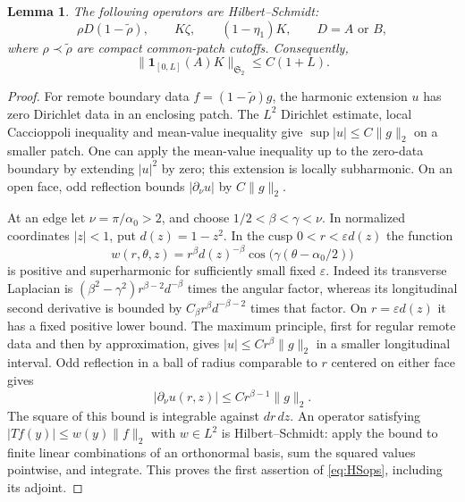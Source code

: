 \documentclass[11pt]{amsart}
\numberwithin{equation}{section}
\newtheorem{lemma}[theorem]{Lemma}
\theoremstyle{remark}
\newcommand{\one}{\mathbf{1}}
\newcommand{\Stwo}{\mathfrak{S}_2}
\begin{document}
\begin{lemma}\label{lem:HS}
The following operators are Hilbert--Schmidt:
\begin{equation}\label{eq:HSops}
\rho D(1-\widetilde\rho),\qquad K\zeta,\qquad (1-\eta_1)K,\qquad D=A\text{ or }B,
\end{equation}
where $\rho\prec\widetilde\rho$ are compact common-patch cutoffs. Consequently,
\begin{equation}\label{eq:HSK}
\|\one_{[0,L]}(A)K\|_{\Stwo}\le C(1+L) .
\end{equation}
\end{lemma}

\begin{proof}
For remote boundary data $f=(1-\widetilde\rho)g$, the harmonic extension $u$ has zero Dirichlet data in an enclosing patch. The $L^2$ Dirichlet estimate, local Caccioppoli inequality and mean-value inequality give $\sup|u|\le C\|g\|_2$ on a smaller patch. One can apply the mean-value inequality up to the zero-data boundary by extending $|u|^2$ by zero; this extension is locally subharmonic. On an open face, odd reflection bounds $|\partial_\nu u|$ by $C\|g\|_2$.

At an edge let $\nu=\pi/\alpha_0>2$, and choose $1/2<\beta<\gamma<\nu$. In normalized coordinates $|z|<1$, put $d(z)=1-z^2$. In the cusp $0<r<\varepsilon d(z)$ the function
\begin{equation}\label{eq:barrier}
w(r,\theta,z)=r^\beta d(z)^{-\beta}\cos\big(\gamma(\theta-\alpha_0/2)\big)
\end{equation}
is positive and superharmonic for sufficiently small fixed $\varepsilon$. Indeed its transverse Laplacian is $(\beta^2-\gamma^2)r^{\beta-2}d^{-\beta}$ times the angular factor, whereas its longitudinal second derivative is bounded by $C_\beta r^\beta d^{-\beta-2}$ times that factor. On $r=\varepsilon d(z)$ it has a fixed positive lower bound. The maximum principle, first for regular remote data and then by approximation, gives $|u|\le Cr^\beta\|g\|_2$ in a smaller longitudinal interval. Odd reflection in a ball of radius comparable to $r$ centered on either face gives
\begin{equation}\label{eq:normalderiv}
|\partial_\nu u(r,z)|\le Cr^{\beta-1}\|g\|_2 .
\end{equation}
The square of this bound is integrable against $dr\,dz$. An operator satisfying $|Tf(y)|\le w(y)\|f\|_2$ with $w\in L^2$ is Hilbert--Schmidt: apply the bound to finite linear combinations of an orthonormal basis, sum the squared values pointwise, and integrate. This proves the first assertion of \eqref{eq:HSops}, including its adjoint.


\end{proof}
\end{document}
